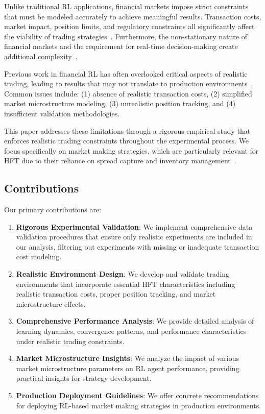 \documentclass[11pt,a4paper]{article}
\begin{document}
Unlike traditional RL applications, financial markets impose strict constraints that must be modeled accurately to achieve meaningful results. Transaction costs, market impact, position limits, and regulatory constraints all significantly affect the viability of trading strategies~\cite{almgren2001optimal}. Furthermore, the non-stationary nature of financial markets and the requirement for real-time decision-making create additional complexity~\cite{moody2001learning}.

Previous work in financial RL has often overlooked critical aspects of realistic trading, leading to results that may not translate to production environments~\cite{fischer2018reinforcement}. Common issues include: (1) absence of realistic transaction costs, (2) simplified market microstructure modeling, (3) unrealistic position tracking, and (4) insufficient validation methodologies.

This paper addresses these limitations through a rigorous empirical study that enforces realistic trading constraints throughout the experimental process. We focus specifically on market making strategies, which are particularly relevant for HFT due to their reliance on spread capture and inventory management~\cite{avellaneda2008high}.

\subsection{Contributions}

Our primary contributions are:

\begin{enumerate}
\item \textbf{Rigorous Experimental Validation}: We implement comprehensive data validation procedures that ensure only realistic experiments are included in our analysis, filtering out experiments with missing or inadequate transaction cost modeling.

\item \textbf{Realistic Environment Design}: We develop and validate trading environments that incorporate essential HFT characteristics including realistic transaction costs, proper position tracking, and market microstructure effects.

\item \textbf{Comprehensive Performance Analysis}: We provide detailed analysis of learning dynamics, convergence patterns, and performance characteristics under realistic trading constraints.

\item \textbf{Market Microstructure Insights}: We analyze the impact of various market microstructure parameters on RL agent performance, providing practical insights for strategy development.

\item \textbf{Production Deployment Guidelines}: We offer concrete recommendations for deploying RL-based market making strategies in production environments.
\end{enumerate}
\end{document}
